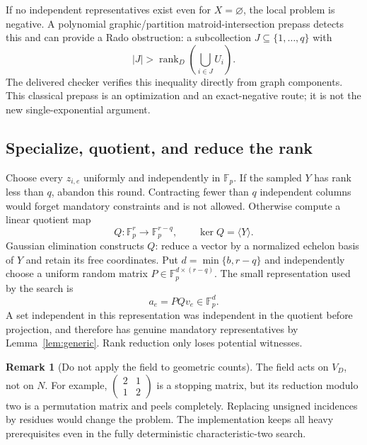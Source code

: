 \documentclass[11pt,letterpaper]{article}
\theoremstyle{definition}
\newtheorem{remark}[theorem]{Remark}
\newcommand{\F}{\mathbb F}
\newcommand{\rk}{\operatorname{rank}}
\begin{document}
If no independent representatives exist even for $X=\varnothing$, the local
problem is negative. A polynomial graphic/partition matroid-intersection
prepass detects this and can provide a Rado obstruction: a subcollection
$J\subseteq\{1,\ldots,q\}$ with
\begin{equation}\label{eq:rado}
 |J|>\rk_D\left(\bigcup_{i\in J}U_i\right).
\end{equation}
The delivered checker verifies this inequality directly from graph
components. This classical prepass is an optimization and an exact-negative
route; it is not the new single-exponential argument.

\subsection{Specialize, quotient, and reduce the rank}
Choose every $z_{i,e}$ uniformly and independently in $\F_p$. If the sampled
$Y$ has rank less than $q$, abandon this round. Contracting fewer than $q$
independent columns would forget mandatory constraints and is not allowed.
Otherwise compute a linear quotient map
\[
 Q:\F_p^r\longrightarrow\F_p^{r-q},\qquad\ker Q=\langle Y\rangle.
\]
Gaussian elimination constructs $Q$: reduce a vector by a normalized echelon
basis of $Y$ and retain its free coordinates. Put
$d=\min\{b,r-q\}$ and independently choose a uniform random matrix
$P\in\F_p^{d\times(r-q)}$. The small representation used by the search is
\begin{equation}\label{eq:small-rep}
 a_e=P Q v_e\in\F_p^d.
\end{equation}
A set independent in this representation was independent in the quotient
before projection, and therefore has genuine mandatory representatives by
Lemma~\ref{lem:generic}. Rank reduction only loses potential witnesses.

\begin{remark}[Do not apply the field to geometric counts]
The field acts on $V_D$, not on $N$. For example,
$\left(\begin{smallmatrix}2&1\\1&2\end{smallmatrix}\right)$ is a stopping
matrix, but its reduction modulo two is a permutation matrix and peels
completely. Replacing unsigned incidences by residues would change the
problem. The implementation keeps all heavy prerequisites even in the
fully deterministic characteristic-two search.
\end{remark}
\end{document}
